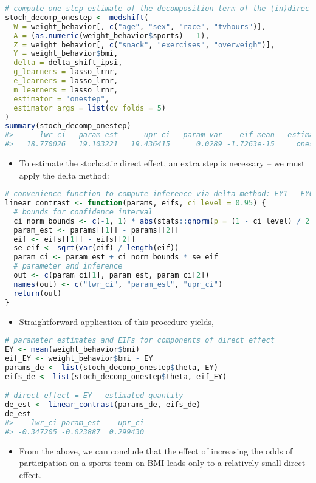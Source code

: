 \documentclass[
  12pt,
]{book}
\providecommand{\tightlist}{%
  \setlength{\itemsep}{0pt}\setlength{\parskip}{0pt}}
\theoremstyle{definition}
\theoremstyle{definition}
\theoremstyle{definition}
\newcommand{\1}{\mathbbm{1}}
\begin{document}
\begin{lstlisting}[language=R]
# compute one-step estimate of the decomposition term of the (in)direct effects
stoch_decomp_onestep <- medshift(
  W = weight_behavior[, c("age", "sex", "race", "tvhours")],
  A = (as.numeric(weight_behavior$sports) - 1),
  Z = weight_behavior[, c("snack", "exercises", "overweigh")],
  Y = weight_behavior$bmi,
  delta = delta_shift_ipsi,
  g_learners = lasso_lrnr,
  e_learners = lasso_lrnr,
  m_learners = lasso_lrnr,
  estimator = "onestep",
  estimator_args = list(cv_folds = 5)
)
summary(stoch_decomp_onestep)
#>      lwr_ci   param_est      upr_ci   param_var    eif_mean   estimator 
#>   18.770026   19.103221   19.436415      0.0289 -1.7263e-15     onestep
\end{lstlisting}

\begin{itemize}
\tightlist
\item
  To estimate the stochastic direct effect, an extra step is necessary -- we
  must apply the delta method:
\end{itemize}

\begin{lstlisting}[language=R]
# convenience function to compute inference via delta method: EY1 - EY0
linear_contrast <- function(params, eifs, ci_level = 0.95) {
  # bounds for confidence interval
  ci_norm_bounds <- c(-1, 1) * abs(stats::qnorm(p = (1 - ci_level) / 2))
  param_est <- params[[1]] - params[[2]]
  eif <- eifs[[1]] - eifs[[2]]
  se_eif <- sqrt(var(eif) / length(eif))
  param_ci <- param_est + ci_norm_bounds * se_eif
  # parameter and inference
  out <- c(param_ci[1], param_est, param_ci[2])
  names(out) <- c("lwr_ci", "param_est", "upr_ci")
  return(out)
}
\end{lstlisting}

\begin{itemize}
\tightlist
\item
  Straightforward application of this procedure yields,
\end{itemize}

\begin{lstlisting}[language=R]
# parameter estimates and EIFs for components of direct effect
EY <- mean(weight_behavior$bmi)
eif_EY <- weight_behavior$bmi - EY
params_de <- list(stoch_decomp_onestep$theta, EY)
eifs_de <- list(stoch_decomp_onestep$theta, eif_EY)

# direct effect = EY - estimated quantity
de_est <- linear_contrast(params_de, eifs_de)
de_est
#>    lwr_ci param_est    upr_ci 
#> -0.347205 -0.023887  0.299430
\end{lstlisting}

\begin{itemize}
\tightlist
\item
  From the above, we can conclude that the effect of increasing the odds of
  participation on a sports team on BMI leads only to a relatively small direct
  effect.
\end{itemize}

  

\backmatter
\printindex
\end{document}
